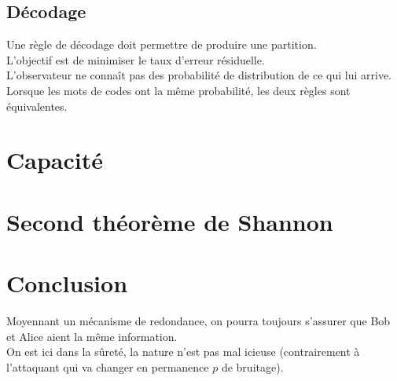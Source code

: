 \subsection{Décodage}
Une règle de décodage doit permettre de produire une partition.\\
L'objectif est de minimiser le taux d'erreur résiduelle.\\
L'observateur ne connaît pas des probabilité de distribution de ce qui lui arrive.\\
Lorsque les mots de codes ont la même probabilité, les deux règles sont équivalentes.\\
\section{Capacité}
\section{Second théorème de Shannon}
\section{Conclusion}
Moyennant un mécanisme de redondance, on pourra toujours s'assurer que Bob et Alice aient la même information.\\
On est ici dans la sûreté, la nature n'est pas mal	icieuse (contrairement à l'attaquant qui va changer en permanence $p$ de bruitage).